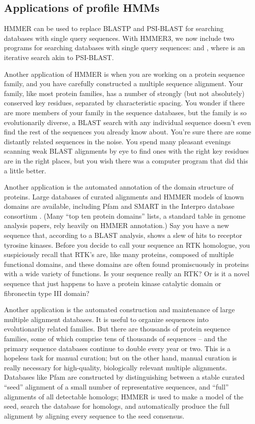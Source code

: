 \subsection{Applications of profile HMMs}

HMMER can be used to replace BLASTP and PSI-BLAST for searching
databases with single query sequences. With HMMER3, we now include two
programs for searching databases with single query sequences:
 and , where  is an
iterative search akin to PSI-BLAST.

Another application of HMMER is when you are working on a protein
sequence family, and you have carefully constructed a multiple
sequence alignment. Your family, like most protein families, has a
number of strongly (but not absolutely) conserved key residues,
separated by characteristic spacing. You wonder if there are more
members of your family in the sequence databases, but the family is so
evolutionarily diverse, a BLAST search with any individual sequence
doesn't even find the rest of the sequences you already know
about. You're sure there are some distantly related sequences in the
noise. You spend many pleasant evenings scanning weak BLAST alignments
by eye to find ones with the right key residues are in the right
places, but you wish there was a computer program that did this a
little better.

Another application is the automated annotation of the domain
structure of proteins. Large databases of curated alignments and HMMER
models of known domains are available, including Pfam \citep{Finn10}
and SMART \citep{Letunic06} in the Interpro database consortium
\citep{Mulder03}. (Many ``top ten protein domains'' lists, a standard
table in genome analysis papers, rely heavily on HMMER annotation.)
Say you have a new sequence that, according to a BLAST analysis, shows
a slew of hits to receptor tyrosine kinases. Before you decide to call
your sequence an RTK homologue, you suspiciously recall that RTK's
are, like many proteins, composed of multiple functional domains, and
these domains are often found promiscuously in proteins with a wide
variety of functions. Is your sequence really an RTK? Or is it a novel
sequence that just happens to have a protein kinase catalytic domain
or fibronectin type III domain?

Another application is the automated construction and maintenance
of large multiple alignment databases.  It is useful to organize
sequences into evolutionarily related families. But there are
thousands of protein sequence families, some of which comprise tens of
thousands of sequences -- and the primary sequence databases continue
to double every year or two. This is a hopeless task for manual
curation; but on the other hand, manual curation is really necessary
for high-quality, biologically relevant multiple alignments. Databases
like Pfam \citep{Finn10} are constructed by distinguishing between a
stable curated ``seed'' alignment of a small number of representative
sequences, and ``full'' alignments of all detectable homologs; HMMER
is used to make a model of the seed, search the database for homologs,
and automatically produce the full alignment by aligning every
sequence to the seed consensus.

